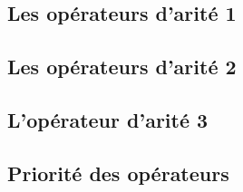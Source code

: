 \subsection*{Les opérateurs d'arité 1}













\subsection*{Les opérateurs d'arité 2}

























































\subsection*{L'opérateur d'arité 3}



\subsection*{Priorité des opérateurs}


